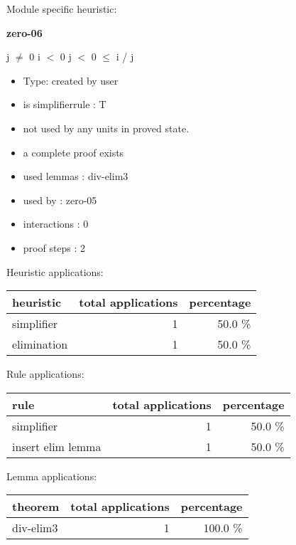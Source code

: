 \documentclass[a4paper]{article}
\begin{document}
Module specific heuristic:

\pagebreak

{\LARGE\bf zero-06}\label{lemma-zero-06}

\medskip

j $\neq$ 0 \Fol i $<$ 0 \And j $<$ 0  $\le$ i / j

\begin{itemize}

\item Type: created by user

\item is simplifierrule : T
\item not used by any units in proved state.
\item       a complete proof exists
\item       used lemmas  : div-elim3
\item       used by      : zero-05
\item       interactions : 0
\item       proof steps  : 2
\end{itemize}

\medskip


Heuristic applications:

\begin{supertabular}{l|r|r}
heuristic	& total applications & percentage \\ \hline
simplifier & 1 & 50.0 \% \\
elimination & 1 & 50.0 \% \\

\end{supertabular}

Rule applications:

\begin{supertabular}{l|r|r}
rule	        & total applications & percentage \\ \hline
simplifier & 1 & 50.0 \% \\
insert elim lemma & 1 & 50.0 \% \\

\end{supertabular}

Lemma applications:

\begin{supertabular}{l|r|r}
theorem	        & total applications & percentage \\ \hline
div-elim3 & 1 & 100.0 \% \\

\end{supertabular}
\end{document}
